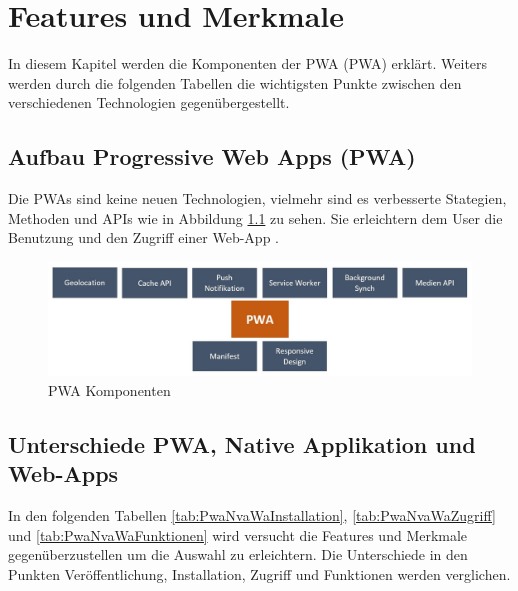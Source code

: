 \chapter{Features und Merkmale}\label{chab:FeaturesundMerkmale}
\thispagestyle{standard}
\pagestyle{standard}
\renewcommand{\footrulewidth}{0.4pt}
In diesem Kapitel werden die Komponenten der \acl{PWA} (\acs{PWA}) erklärt. Weiters werden durch die folgenden Tabellen die wichtigsten Punkte zwischen den verschiedenen Technologien  gegenübergestellt.

\section{Aufbau Progressive Web Apps (PWA)}
Die \acs{PWA}s sind keine neuen Technologien, vielmehr sind es verbesserte Stategien, Methoden und APIs wie in Abbildung \ref{fig:Komponenten} zu sehen. 
Sie erleichtern dem User die Benutzung und den Zugriff einer \acs{Web-App} \cite{AlternativePWA}. 

\begin{figure}[h]
	\centering
	\includegraphics[width=14cm]{BilderAllgemein/PWA_Features}\medskip
	\caption{PWA Komponenten}
	\label{fig:Komponenten}
\end{figure}

\section{Unterschiede PWA, Native Applikation und Web-Apps}\label{chap:UnterschiedePWA,NativeApplikationundWeb-Apps}
In den folgenden Tabellen \ref{tab:PwaNvaWaInstallation}, \ref{tab:PwaNvaWaZugriff} und \ref{tab:PwaNvaWaFunktionen}  wird versucht die Features und Merkmale gegenüberzustellen um die Auswahl zu erleichtern. Die Unterschiede in den Punkten Veröffentlichung, Installation, Zugriff und Funktionen werden verglichen.


